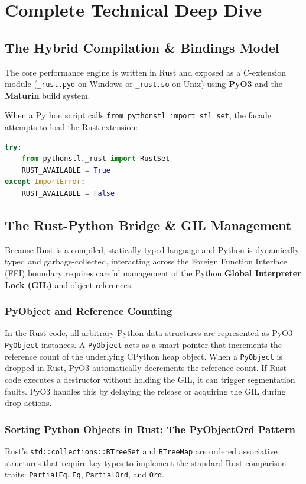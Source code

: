 \documentclass[11pt,a4paper]{article}
\begin{document}
\newpage

\section{Complete Technical Deep Dive}

\subsection{The Hybrid Compilation & Bindings Model}
The core performance engine is written in Rust and exposed as a C-extension module (\texttt{\_rust.pyd} on Windows or \texttt{\_rust.so} on Unix) using \textbf{PyO3} and the \textbf{Maturin} build system. 

When a Python script calls \texttt{from pythonstl import stl\_set}, the facade attempts to load the Rust extension:
\begin{lstlisting}[language=Python]
try:
    from pythonstl._rust import RustSet
    RUST_AVAILABLE = True
except ImportError:
    RUST_AVAILABLE = False
\end{lstlisting}

\subsection{The Rust-Python Bridge & GIL Management}
Because Rust is a compiled, statically typed language and Python is dynamically typed and garbage-collected, interacting across the Foreign Function Interface (FFI) boundary requires careful management of the Python \textbf{Global Interpreter Lock (GIL)} and object references.

\subsubsection{PyObject and Reference Counting}
In the Rust code, all arbitrary Python data structures are represented as PyO3 \texttt{PyObject} instances. A \texttt{PyObject} acts as a smart pointer that increments the reference count of the underlying CPython heap object. When a \texttt{PyObject} is dropped in Rust, PyO3 automatically decrements the reference count. If Rust code executes a destructor without holding the GIL, it can trigger segmentation faults. PyO3 handles this by delaying the release or acquiring the GIL during drop actions.

\subsubsection{Sorting Python Objects in Rust: The PyObjectOrd Pattern}
Rust's \texttt{std::collections::BTreeSet} and \texttt{BTreeMap} are ordered associative structures that require key types to implement the standard Rust comparison traits: \texttt{PartialEq}, \texttt{Eq}, \texttt{PartialOrd}, and \texttt{Ord}. 
\end{document}
